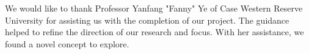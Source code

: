 \documentclass[sigconf]{acmart}
\begin{document}
\begin{acks}
  We would like to thank Professor Yanfang "Fanny" Ye of Case Western Reserve
  University for assisting us with the completion of our project. The guidance
  helped to refine the direction of our research and focus. With her assistance,
  we found a novel concept to explore.
\end{acks}


{}
\end{document}
